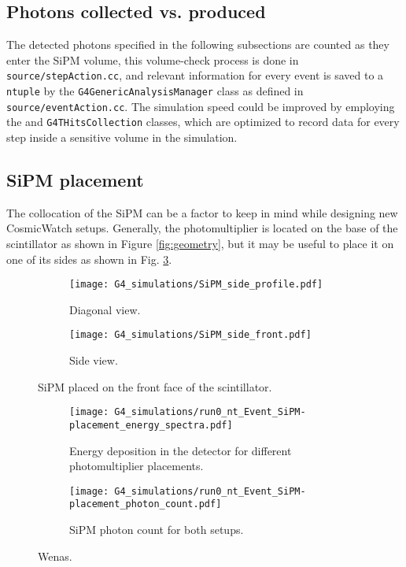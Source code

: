 \subsection{Photons collected vs. produced}\label{sec:collected_produced}

The detected photons specified in the following subsections are counted as they enter the SiPM volume, this volume-check process is done in \texttt{source/stepAction.cc}, and relevant information for every event is saved to a \texttt{ntuple} by the \texttt{G4GenericAnalysisManager} class as defined in \texttt{source/eventAction.cc}. The simulation speed could be improved by employing the  and \texttt{G4THitsCollection} classes, which are optimized to record data for every step inside a sensitive volume in the simulation.

\subsection{SiPM placement}\label{sec:SiPM_placement}

The collocation of the SiPM can be a factor to keep in mind while designing new CosmicWatch setups. Generally, the photomultiplier is located on the base of the scintillator as shown in Figure \ref{fig:geometry}, but it may be useful to place it on one of its sides as shown in Fig. \ref{fig:SiPM_side}.

\begin{figure}[H]
  \centering
  \begin{subfigure}[t]{0.48\textwidth}
    \texttt{[image: G4\_simulations/SiPM\_side\_profile.pdf]}
    \caption{\label{sfig:SiPM_side_profile}Diagonal view.}
  \end{subfigure}
  \hfill
  \begin{subfigure}[t]{0.48\textwidth}
    \texttt{[image: G4\_simulations/SiPM\_side\_front.pdf]}
    \caption{\label{sfig:SiPM_side_front}Side view.}
  \end{subfigure}
  \caption{\label{fig:SiPM_side}SiPM placed on the front face of the scintillator.}
\end{figure}

\begin{figure}[H]
    \centering
    \begin{subfigure}[t]{0.48\textwidth}
      \texttt{[image: G4\_simulations/run0\_nt\_Event\_SiPM-placement\_energy\_spectra.pdf]}
      \caption{\label{sfig:SiPM_place_edep}Energy deposition in the detector for different photomultiplier placements.}
    \end{subfigure}
    \hfill
    \begin{subfigure}[t]{0.48\textwidth}
      \texttt{[image: G4\_simulations/run0\_nt\_Event\_SiPM-placement\_photon\_count.pdf]}
      \caption{\label{sfig:SiPM_place_pcount}SiPM photon count for both setups.}
    \end{subfigure}
    \caption{\label{fig:SiPM_place_results}Wenas.}
\end{figure}

